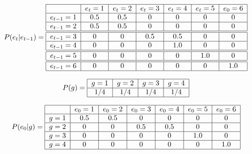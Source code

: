 \documentclass[a4paper,10pt]{article}
\begin{document}
\begin{align}
\centering
P(e_{t}|e_{t-1}) = \begin{tabular}{|c|c|c|c|c|c|c|}
        \hline
        & $e_t=1$ & $e_t=2$ & $e_t=3$ &  $e_t=4$ & $e_t=5$ & $e_0=6$ \\ \hline
       $e_{t-1}=1$ & $0.5$ & $0.5$ & $0$ &  $0$ & $0$ & $0$ \\ \hline
       $e_{t-1}=2$ & $0.5$ & $0.5$ & $0$ & $0$ & $0$ & $0$ \\ \hline \hline
       $e_{t-1}=3$ & $0$ & $0$ & $0.5$ & $0.5$ & $0$ & $0$ \\ \hline
       $e_{t-1}=4$ & $0$ & $0$ & $0$ & $1.0$ & $0$ & $0$ \\ \hline \hline
       $e_{t-1}=5$ & $0$ & $0$ & $0$ & $0$ & $1.0$ & $0$ \\ \hline \hline
       $e_{t-1}=6$ & $0$ & $0$ & $0$ & $0$ & $0$ & $1.0$ \\ \hline
\end{tabular}
\end{align}




\begin{align}
\centering
P(g) = \begin{tabular}{|c|c|c|c|}
        \hline
        $g=1$ & $g=2$ & $g=3$  & $g=4$\\ \hline
        $1/4$ & $1/4$ & $1/4$ & $1/4$ \\ \hline
\end{tabular}
\end{align}

\begin{align}
\centering
P(e_0|g) = \begin{tabular}{|c|c|c|c|c|c|c|}
        \hline
        & $e_0=1$ & $e_0=2$ & $e_0=3$ &  $e_0=4$ & $e_0=5$ & $e_0=6$ \\ \hline
       $g=1$ & $0.5$ & $0.5$ & $0$ &  $0$ & $0$ & $0$ \\ \hline
       $g=2$ & $0$ & $0$ & $0.5$ & $0.5$ & $0$ & $0$ \\ \hline
       $g=3$ & $0$ & $0$ & $0$ & $0$ & $1.0$ & $0$ \\ \hline
       $g=4$ & $0$ & $0$ & $0$ & $0$ & $0$ & $1.0$ \\ \hline
\end{tabular}
\end{align}





\begin{figure}[H]
\centering
{}
\caption{}
\label{fig:modelo_grafico}
\end{figure}
\end{document}
